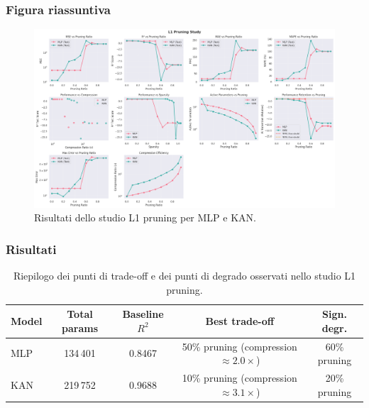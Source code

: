 \documentclass[a4paper,12pt]{report}
\begin{document}
	\subsubsection{Figura riassuntiva}
	\begin{figure}[H]
		\centering
		\includegraphics[width=1.0\textwidth]{img/abl_kanvsmlp_car.png}
		\caption{Risultati dello studio L1 pruning per MLP e KAN.}
	\end{figure}
	
	\subsubsection{Risultati}
	\begin{table}[H]
		\centering
		\setlength{\tabcolsep}{4pt}
		\begin{tabular}{lcccc}
			\toprule
			\textbf{Model} & \textbf{Total params} & \textbf{Baseline $R^2$} & \textbf{Best trade-off} & \textbf{Sign. degr.} \\
			\midrule
			MLP & 134\,401  & 0.8467 & 50\% pruning (compression $\approx 2.0\times$) & 60\% pruning \\
			KAN & 219\,752  & 0.9688 & 10\% pruning (compression $\approx 3.1\times$) & 20\% pruning \\
			\bottomrule
		\end{tabular}
		\caption{Riepilogo dei punti di trade-off e dei punti di degrado osservati nello studio L1 pruning.}
	\end{table}
	
\end{document}
